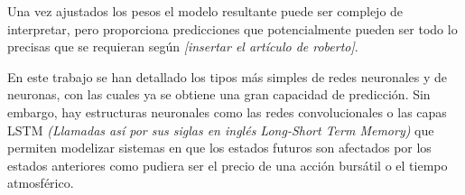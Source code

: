 \noindent Una vez ajustados los pesos el modelo resultante puede ser complejo de interpretar, pero proporciona predicciones que potencialmente pueden ser todo lo precisas que se requieran según \textit{[insertar el artículo de roberto]}. 

\noindent En este trabajo se han detallado los tipos más simples de redes neuronales y de neuronas, con las cuales ya se obtiene una gran capacidad de predicción. Sin embargo, hay estructuras neuronales como las redes convolucionales o las capas LSTM \textit{(Llamadas así por sus siglas en inglés Long-Short Term Memory)} que permiten modelizar sistemas en que los estados futuros son afectados por los estados anteriores como pudiera ser el precio de una acción bursátil o el tiempo atmosférico.